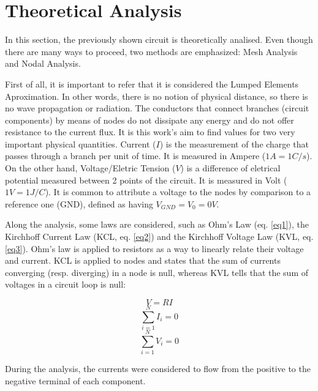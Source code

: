 
\section{Theoretical Analysis}
\label{sec:analysis}
\vspace{3mm}
\par In this section, the previously shown circuit is theoretically analised. Even though there are many ways to proceed, two methods are emphasized: Mesh Analysis and Nodal Analysis.
\vspace{3mm}
\par First of all, it is important to refer that it is considered the Lumped Elements Aproximation. In other words, there is no notion of physical distance, so there is no wave propagation or radiation. The conductors that connect branches (circuit components) by means of nodes do not dissipate any energy and do not offer resistance to the current flux. It is this work's aim to find values for two very important physical quantities. Current ($I$) is the measurement of the charge that passes through a branch per unit of time. It is measured in Ampere ($1A = 1C/s$). On the other hand, Voltage/Eletric Tension ($V$) is a difference of eletrical potential measured between 2 points of the circuit. It is measured in Volt ($1V=1J/C$). It is common to attribute a voltage to the nodes by comparison to a reference one (GND), defined as having $V_{GND}=V_0=0V$.
\vspace{3mm}
\par Along the analysis, some laws are considered, such as Ohm's Law (eq. \ref{eq1}), the Kirchhoff Current Law (KCL, eq. \ref{eq2}) and the Kirchhoff Voltage Law (KVL, eq. \ref{eq3}). Ohm's law is applied to resistors as a way to linearly relate their voltage and current. KCL is applied to nodes and states that the sum of currents converging (resp. diverging) in a node is null, whereas KVL tells that the sum of voltages in a circuit loop is null:

\begin{equation}
  \label{eq1}
   V=RI
\end{equation}
\begin{equation}
  \label{eq2}
   \sum_{i=1}^{N} I_i = 0
\end{equation}
\begin{equation}
  \label{eq3}
   \sum_{i=1}^{N} V_i = 0
\end{equation}

\vspace{3mm}
\par During the analysis, the currents were considered to flow from the positive to the negative terminal of each component.


